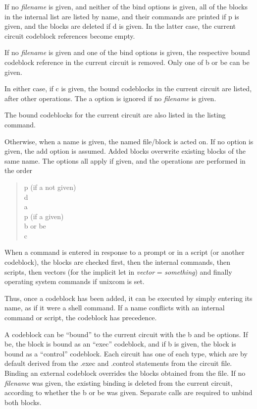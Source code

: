 If no {\it filename} is given, and neither of the bind options is
given, all of the blocks in the internal list are listed by name, and
their commands are printed if {\vt p} is given, and the blocks are
deleted if {\vt d} is given.  In the latter case, the current circuit
codeblock references become empty.

If no {\it filename} is given and one of the bind options is given,
the respective bound codeblock reference in the current circuit is
removed.  Only one of {\vt b} or {\vt be} can be given.

In either case, if {\vt c} is given, the bound codeblocks in the
current circuit are listed, after other operations.  The {\vt a}
option is ignored if no {\it filename} is given.

The bound codeblocks for the current circuit are also listed in the
{\cb listing} command.

Otherwise, when a name is given, the named file/block is acted on.
If no option is given, the add option is assumed.  Added blocks
overwrite existing blocks of the same name.  The options all apply
if given, and the operations are performed in the order
\begin{quote}
{\vt p} (if {\vt a} not given)\\
{\vt d}\\
{\vt a}\\
{\vt p} (if {\vt a} given)\\
{\vt b} or {\vt be}\\
{\vt c}
\end{quote}

When a command is entered in response to a prompt or in a script (or
another codeblock), the blocks are checked first, then the {\WRspice}
internal commands, then scripts, then vectors (for the implicit {\cb
let} in {\it vector} = {\it something\/}) and finally operating system
commands if {\et unixcom} is set.

Thus, once a codeblock has been added, it can be executed by simply
entering its name, as if it were a shell command.  If a name conflicts
with an internal command or script, the codeblock has precedence.

A codeblock can be ``bound'' to the current circuit with the {\vt b}
and {\vt be} options.  If {\vt be}, the block is bound as an ``exec''
codeblock, and if {\vt b} is given, the block is bound as a
``control'' codeblock.  Each circuit has one of each type, which are
by default derived from the {\vt .exec} and {\vt .control} statements
from the circuit file.  Binding an external codeblock overrides the
blocks obtained from the file.  If no {\it filename} was given, the
existing binding is deleted from the current circuit, according to
whether the {\vt b} or {\vt be} was given.  Separate calls are
required to unbind both blocks.

